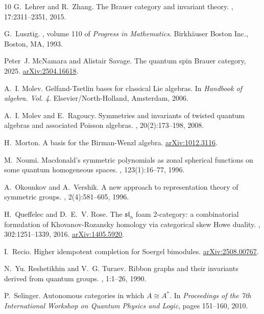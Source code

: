 \documentclass[10pt]{amsart}
\numberwithin{equation}{section}
\newcommand{\arxiv}[1]{\href{https://arxiv.org/abs/#1}{\small  arXiv:#1}}
\theoremstyle{definition}
\newcommand{\sln}[1][n]{\mathfrak{sl}_{#1}}
\begin{document}
\begin{thebibliography}{10}
G.~Lehrer and R.~Zhang.
\newblock The {B}rauer category and invariant theory.
, 17:2311--2351, 2015.

G.~Lusztig.
, volume 110 of {\em Progress in
  Mathematics}.
\newblock Birkh\"auser Boston Inc., Boston, MA, 1993.

Peter~J. McNamara and Alistair Savage.
\newblock The quantum spin {B}rauer category, 2025.
\newblock \arxiv{2504.16618}.

A.~I. Molev.
\newblock Gelfand-{T}setlin bases for classical {L}ie algebras.
\newblock In {\em Handbook of algebra. {V}ol. 4}. Elsevier/North-Holland,
  Amsterdam, 2006.

A.~I. Molev and E.~Ragoucy.
\newblock Symmetries and invariants of twisted quantum algebras and associated
  {P}oisson algebras.
, 20(2):173--198, 2008.

H.~Morton.
\newblock A basis for the {B}irman-{W}enzl algebra.
\newblock \arxiv{1012.3116}.

M.~Noumi.
\newblock Macdonald's symmetric polynomials as zonal spherical functions on
  some quantum homogeneous spaces.
, 123(1):16--77, 1996.

A.~Okounkov and A.~Vershik.
\newblock A new approach to representation theory of symmetric groups.
, 2(4):581--605, 1996.

H.~{Queffelec} and D.~E.~V. {Rose}.
\newblock The $\sln$ foam $2$-category: a combinatorial formulation of
  {K}hovanov-{R}ozansky homology via categorical skew {H}owe duality.
, 302:1251--1339, 2016.
\newblock \href{http://arxiv.org/abs/1405.5920}{arXiv:1405.5920}.

I.~Recio.
\newblock Higher idempotent completion for {S}oergel bimodules.
\newblock \arxiv{2508.00767}.

N.~Yu. Reshetikhin and V.~G. Turaev.
\newblock Ribbon graphs and their invariants derived from quantum groups.
, 1:1--26, 1990.

P.~Selinger.
\newblock Autonomous categories in which ${A} \cong {A}^{*}$.
\newblock In {\em Proceedings of the 7th International Workshop on Quantum
  Physics and Logic}, pages 151--160, 2010.


\end{thebibliography}
\end{document}
